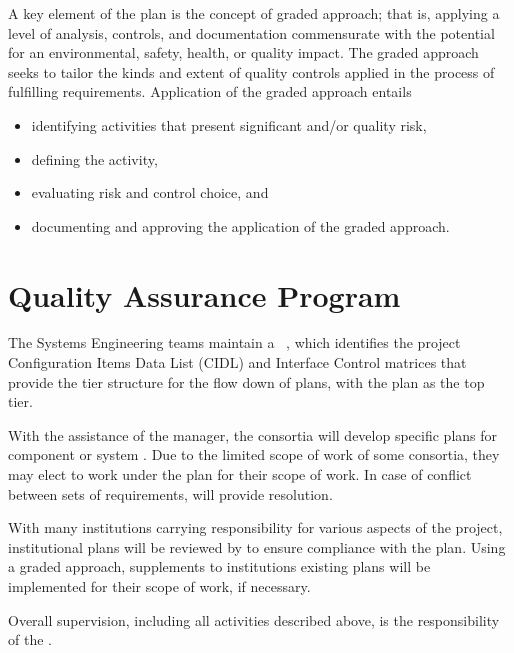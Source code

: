 A key element of the   plan is the
concept of graded approach; that is, applying a level of analysis,
controls, and documentation commensurate with the potential for an
environmental, safety, health, or quality impact. The graded approach
seeks to tailor the kinds and extent of quality controls applied in
the process of fulfilling requirements. Application of the graded
approach entails
\begin{itemize}
  \item identifying activities that present significant 
    and/or quality risk,
  \item defining the activity,
  \item evaluating risk and control choice, and 
  \item documenting and approving the application of the graded
    approach.
\end{itemize}

\section{Quality Assurance Program}

The  Systems Engineering teams maintain a
 ~\cite{bib:docdb82}, which identifies the  project
Configuration Items Data List (CIDL) and Interface Control matrices
that provide the tier structure for the flow down of  plans,
with the   plan as the top tier.

With the
assistance of the   manager, the consortia will develop specific  plans  for
component or system . Due to the limited scope of
work of some consortia, they may elect to work under the
  plan for their scope of work. In
case of conflict between sets of  requirements, 
 will provide resolution.

With many institutions carrying responsibility for various aspects of
the project, institutional  plans will be reviewed by
  to ensure compliance with the
  plan. Using a graded approach,
supplements to institutions existing plans will be implemented for
their  scope of work, if necessary.

Overall  supervision, including all activities described
above, is the responsibility of the  .

